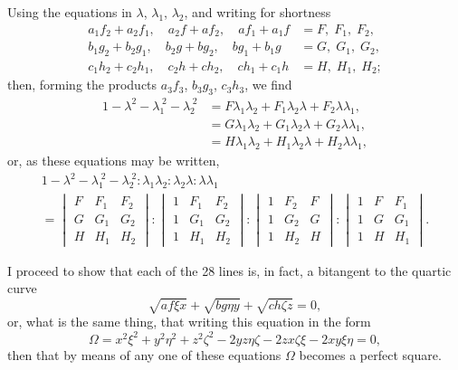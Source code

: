 \documentclass[11pt,a4paper]{article}
\theoremstyle{plain}
\theoremstyle{definition}
\theoremstyle{remark}
\begin{document}
Using the equations in $\lambda$, $\lambda_1$, $\lambda_2$, and writing for shortness
\begin{align*}
a_1f_2 + a_2f_1,\quad a_2f + af_2,\quad af_1 + a_1f &= F,\;F_1,\;F_2,\\
b_1g_2 + b_2g_1,\quad b_2g + bg_2,\quad bg_1 + b_1g &= G,\;G_1,\;G_2,\\
c_1h_2 + c_2h_1,\quad c_2h + ch_2,\quad ch_1 + c_1h &= H,\;H_1,\;H_2;
\end{align*}
then, forming the products $a_3f_3$, $b_3g_3$, $c_3h_3$, we find
\begin{align*}
1 - \lambda^2 - \lambda_1^{\;2} - \lambda_2^{\;2} &= F\lambda_1\lambda_2 + F_1\lambda_2\lambda + F_2\lambda\lambda_1,\\
&= G\lambda_1\lambda_2 + G_1\lambda_2\lambda + G_2\lambda\lambda_1,\\
&= H\lambda_1\lambda_2 + H_1\lambda_2\lambda + H_2\lambda\lambda_1,
\end{align*}
or, as these equations may be written,
\begin{multline*}
1 - \lambda^2 - \lambda_1^{\;2} - \lambda_2^{\;2} : \lambda_1\lambda_2 : \lambda_2\lambda : \lambda\lambda_1\\
= \begin{vmatrix} F & F_1 & F_2 \\ G & G_1 & G_2 \\ H & H_1 & H_2 \end{vmatrix}
: \begin{vmatrix} 1 & F_1 & F_2 \\ 1 & G_1 & G_2 \\ 1 & H_1 & H_2 \end{vmatrix}
: \begin{vmatrix} 1 & F_2 & F \\ 1 & G_2 & G \\ 1 & H_2 & H \end{vmatrix}
: \begin{vmatrix} 1 & F & F_1 \\ 1 & G & G_1 \\ 1 & H & H_1 \end{vmatrix}.
\end{multline*}

I proceed to show that each of the 28 lines is, in fact, a bitangent to the quartic curve
\[
\sqrt{af\xi x} + \sqrt{bg\eta y} + \sqrt{ch\zeta z} = 0,
\]
or, what is the same thing, that writing this equation in the form
\[
\Omega = x^2\xi^2 + y^2\eta^2 + z^2\zeta^2 - 2yz\eta\zeta - 2zx\zeta\xi - 2xy\xi\eta = 0,
\]
then that by means of any one of these equations $\Omega$ becomes a perfect square.
\end{document}
